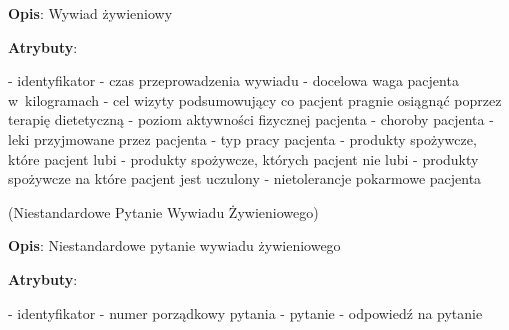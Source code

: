 \begin{enumerate}[label={\textbf{KAT/\protect\threedigits{\theenumi}}}, wide, labelwidth=!, labelindent=0pt, labelsep=0pt, series=reqs]
    \textbf{Opis}: Wywiad żywieniowy
    \par
    \textbf{Atrybuty}:
    \begin{itemize}[series=atr, wide, align=left, leftmargin=190pt]
        \label{kat:NutritionalInterview:id}- identyfikator
        \label{kat:NutritionalInterview:completionDate}- czas przeprowadzenia wywiadu
        \label{kat:NutritionalInterview:targetWeight}- docelowa waga pacjenta w~kilogramach
        \label{kat:NutritionalInterview:advicePurpose}- cel wizyty podsumowujący co pacjent pragnie osiągnąć poprzez terapię dietetyczną
        \label{kat:NutritionalInterview:physicalActivity}- poziom aktywności fizycznej pacjenta
        \label{kat:NutritionalInterview:diseases}- choroby pacjenta
        \label{kat:NutritionalInterview:medicines}- leki przyjmowane przez pacjenta
        \label{kat:NutritionalInterview:jobType}- typ pracy pacjenta
        \label{kat:NutritionalInterview:likedProducts}- produkty spożywcze, które pacjent lubi
        \label{kat:NutritionalInterview:dislikedProducts}- produkty spożywcze, których pacjent nie lubi
        \label{kat:NutritionalInterview:foodAllergies}- produkty spożywcze na które pacjent jest uczulony
        \label{kat:NutritionalInterview:foodIntolerances}- nietolerancje pokarmowe pacjenta
    \end{itemize}

    \label{kat:CustomNutritionalInterviewQuestion} (Niestandardowe Pytanie Wywiadu Żywieniowego)

    \textbf{Opis}: Niestandardowe pytanie wywiadu żywieniowego
    \par
    \textbf{Atrybuty}:
    \begin{itemize}[series=atr, wide, align=left, leftmargin=190pt]
        \label{kat:CustomNutritionalInterviewQuestion:id}- identyfikator
        \label{kat:CustomNutritionalInterviewQuestion:ordinalNumber}- numer porządkowy pytania
        \label{kat:CustomNutritionalInterviewQuestion:question}- pytanie
        \label{kat:CustomNutritionalInterviewQuestion:answer}- odpowiedź na pytanie
    \end{itemize}


\end{enumerate}
